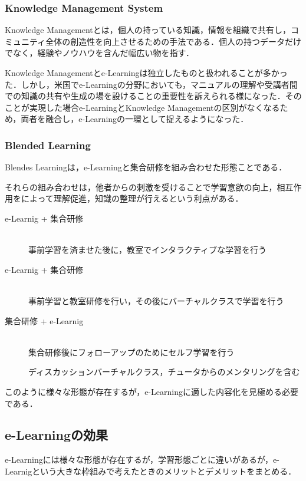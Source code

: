 \documentclass[a4j,12pt]{jsarticle}
\begin{document}
\subsubsection{Knowledge Management System}
Knowledge Managementとは，個人の持っている知識，情報を組織で共有し，コミュニティ全体の創造性を向上させるための手法である．個人の持つデータだけでなく，経験やノウハウを含んだ幅広い物を指す．

Knowledge Managementとe-Learningは独立したものと扱われることが多かった．しかし，米国でe-Learningの分野においても，マニュアルの理解や受講者間での知識の共有や生成の場を設けることの重要性を訴えられる様になった．そのことが実現した場合e-LearningとKnowledge Managementの区別がなくなるため，両者を融合し，e-Learningの一環として捉えるようになった．

\subsubsection{Blended Learning}
Blendes Learningは，e-Learningと集合研修を組み合わせた形態ことである．

それらの組み合わせは，他者からの刺激を受けることで学習意欲の向上，相互作用をによって理解促進，知識の整理が行えるという利点がある．
\begin{description} 

\item[e-Learnig + 集合研修]\mbox{}\\ 
事前学習を済ませた後に，教室でインタラクティブな学習を行う

\item[e-Learnig + 集合研修]\mbox{}\\ 
事前学習と教室研修を行い，その後にバーチャルクラスで学習を行う

\item[集合研修 + e-Learnig]\mbox{}\\ 
集合研修後にフォローアップのためにセルフ学習を行う

ディスカッションバーチャルクラス，チュータからのメンタリングを含む
\end{description}
このように様々な形態が存在するが，e-Learningに適した内容化を見極める必要である．

\subsection{e-Learningの効果}
e-Learningには様々な形態が存在するが，学習形態ごとに違いがあるが，e-Learnigという大きな枠組みで考えたときのメリットとデメリットをまとめる．
\end{document}
